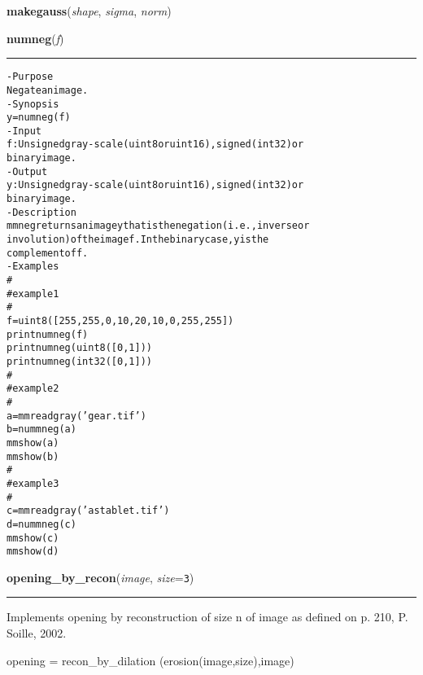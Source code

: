     \label{multireg:morph:makegauss}
    \vspace{0.5ex}

    \begin{boxedminipage}{\textwidth}

    \raggedright \textbf{makegauss}(\textit{shape}, \textit{sigma}, \textit{norm})

    \end{boxedminipage}

    \label{multireg:morph:numneg}
    \vspace{0.5ex}

    \begin{boxedminipage}{\textwidth}

    \raggedright \textbf{numneg}(\textit{f})

    \vspace{-1.5ex}

    \rule{\textwidth}{0.5\fboxrule}
\begin{alltt}
- Purpose
    Negate an image.
- Synopsis
    y = numneg(f)
- Input
    f: Unsigned gray-scale (uint8 or uint16), signed (int32) or
       binary image.
- Output
    y: Unsigned gray-scale (uint8 or uint16), signed (int32) or
       binary image.
- Description
    mmneg returns an image y that is the negation (i.e., inverse or
    involution) of the image f . In the binary case, y is the
    complement of f .
- Examples
    \#
    \#   example 1
    \#
    f=uint8([255, 255, 0, 10, 20, 10, 0, 255, 255])
    print numneg(f)
    print numneg(uint8([0, 1]))
    print numneg(int32([0, 1]))
    \#
    \#   example 2
    \#
    a = mmreadgray('gear.tif')
    b = nummneg(a)
    mmshow(a)
    mmshow(b)
    \#
    \#   example 3
    \#
    c = mmreadgray('astablet.tif')
    d = nummneg(c)
    mmshow(c)
    mmshow(d)\end{alltt}

    \vspace{1ex}

    \end{boxedminipage}

    \label{multireg:morph:opening_by_recon}
    \vspace{0.5ex}

    \begin{boxedminipage}{\textwidth}

    \raggedright \textbf{opening\_by\_recon}(\textit{image}, \textit{size}=\texttt{3\-})

    \vspace{-1.5ex}

    \rule{\textwidth}{0.5\fboxrule}
    Implements opening by reconstruction of size n of image as defined on 
    p. 210, P. Soille, 2002.

    opening = recon\_by\_dilation (erosion(image,size),image)

    \vspace{1ex}

    \end{boxedminipage}

